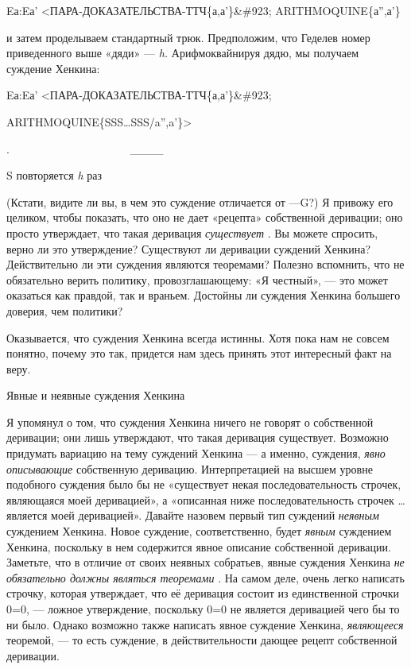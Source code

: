 \documentclass[../main.tex]{subfiles}
\begin{document}
Eа:Eа' \textless ПАРА-ДОКАЗАТЕЛЬСТВА-ТТЧ\{а,а'\}\&\#923; ARITHMOQUINE\{а'',а'\}

и затем проделываем стандартный трюк. Предположим, что Геделев номер приведенного выше «дяди» --- \emph{h.} Арифмоквайнируя дядю, мы получаем суждение Хенкина:

Eа:Eа' \textless ПАРА-ДОКАЗАТЕЛЬСТВА-ТТЧ\{а,а'\}\&\#923;

ARITHMOQUINE\{SSS\ldots SSS/a'',a'\}\textgreater{}

.~~~~~~~~~~~~~~~~~~~~~ \textbar\_\_\_\_\textbar{}

S повторяется \emph{h} раз

(Кстати, видите ли вы, в чем это суждение отличается от ---G?) Я привожу его целиком, чтобы показать, что оно не дает «рецепта» собственной деривации; оно просто утверждает, что такая деривация \emph{существует} . Вы можете спросить, верно ли это утверждение? Существуют ли деривации суждений Хенкина? Действительно ли эти суждения являются теоремами? Полезно вспомнить, что не обязательно верить политику, провозглашающему: «Я честный», --- это может оказаться как правдой, так и враньем. Достойны ли суждения Хенкина большего доверия, чем политики?

Оказывается, что суждения Хенкина всегда истинны. Хотя пока нам не совсем понятно, почему это так, придется нам здесь принять этот интересный факт на веру.

Явные и неявные суждения Хенкина

Я упомянул о том, что суждения Хенкина ничего не говорят о собственной деривации; они лишь утверждают, что такая деривация существует. Возможно придумать вариацию на тему суждений Хенкина --- а именно, суждения, \emph{явно описывающие} собственную деривацию. Интерпретацией на высшем уровне подобного суждения было бы не «существует некая последовательность строчек, являющаяся моей деривацией», а «описанная ниже последовательность строчек \ldots{} является моей деривацией». Давайте назовем первый тип суждений \emph{неявным} суждением Хенкина. Новое суждение, соответственно, будет \emph{явным} суждением Хенкина, поскольку в нем содержится явное описание собственной деривации. Заметьте, что в отличие от своих неявных собратьев, явные суждения Хенкина \emph{не обязательно должны являться теоремами} . На самом деле, очень легко написать строчку, которая утверждает, что её деривация состоит из единственной строчки 0=0, --- ложное утверждение, поскольку 0=0 не является деривацией чего бы то ни было. Однако возможно также написать явное суждение Хенкина, \emph{являющееся} теоремой, --- то есть суждение, в действительности дающее рецепт собственной деривации.
\end{document}
